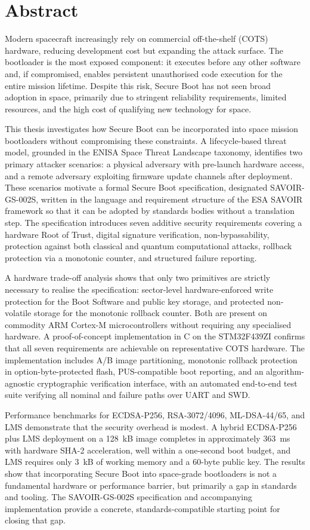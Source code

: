 \chapter*{Abstract}

Modern spacecraft increasingly rely on commercial off-the-shelf (COTS) hardware, reducing development cost but expanding the attack surface. The bootloader is the most exposed component: it executes before any other software and, if compromised, enables persistent unauthorised code execution for the entire mission lifetime. Despite this risk, Secure Boot has not seen broad adoption in space, primarily due to stringent reliability requirements, limited resources, and the high cost of qualifying new technology for space.

This thesis investigates how Secure Boot can be incorporated into space mission bootloaders without compromising these constraints. A lifecycle-based threat model, grounded in the ENISA Space Threat Landscape taxonomy, identifies two primary attacker scenarios: a physical adversary with pre-launch hardware access, and a remote adversary exploiting firmware update channels after deployment. These scenarios motivate a formal Secure Boot specification, designated SAVOIR-GS-002S, written in the language and requirement structure of the ESA SAVOIR framework so that it can be adopted by standards bodies without a translation step. The specification introduces seven additive security requirements covering a hardware Root of Trust, digital signature verification, non-bypassability, protection against both classical and quantum computational attacks, rollback protection via a monotonic counter, and structured failure reporting.

A hardware trade-off analysis shows that only two primitives are strictly necessary to realise the specification: sector-level hardware-enforced write protection for the Boot Software and public key storage, and protected non-volatile storage for the monotonic rollback counter. Both are present on commodity ARM Cortex-M microcontrollers without requiring any specialised hardware. A proof-of-concept implementation in C on the STM32F439ZI confirms that all seven requirements are achievable on representative COTS hardware. The implementation includes A/B image partitioning, monotonic rollback protection in option-byte-protected flash, PUS-compatible boot reporting, and an algorithm-agnostic cryptographic verification interface, with an automated end-to-end test suite verifying all nominal and failure paths over UART and SWD.

Performance benchmarks for ECDSA-P256, RSA-3072/4096, ML-DSA-44/65, and LMS demonstrate that the security overhead is modest. A hybrid ECDSA-P256 plus LMS deployment on a 128~kB image completes in approximately 363~ms with hardware SHA-2 acceleration, well within a one-second boot budget, and LMS requires only 3~kB of working memory and a 60-byte public key. The results show that incorporating Secure Boot into space-grade bootloaders is not a fundamental hardware or performance barrier, but primarily a gap in standards and tooling. The SAVOIR-GS-002S specification and accompanying implementation provide a concrete, standards-compatible starting point for closing that gap.
